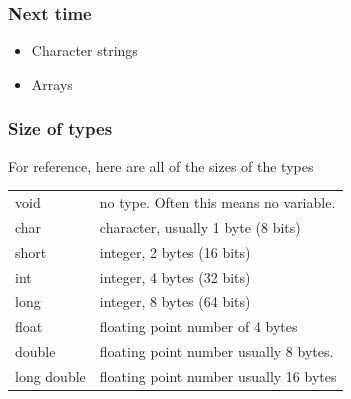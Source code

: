 \documentclass{beamer}
\begin{document}
\begin{frame}
  \frametitle{Next time}
  \begin{itemize}
    \item Character strings
    \item Arrays
  \end{itemize}
\end{frame}

\begin{frame}[fragile]
  \frametitle{Size of types}
  For reference, here are all of the sizes of the types
  \begin{tabular}{ll}
      void & no type. Often this means no variable.\\
      char & character, usually 1 byte (8 bits)\\
      short & integer, 2 bytes (16 bits)\\
      int  & integer, 4 bytes (32 bits)\\
      long & integer, 8 bytes (64 bits)\\
      float & floating point number of 4 bytes\\
      double & floating point number usually 8 bytes.\\
      long double & floating point number usually 16 bytes\\
  \end{tabular}
\end{frame}
\end{document}
